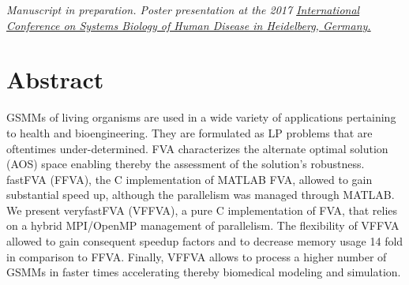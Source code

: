 { \textit{Manuscript in preparation. Poster presentation at the 2017 
\href{https://www.sbhd-conference.org/2017/images/Alphabetical_list_poster_presenters-SBHD_2017.pdf}{International Conference on Systems Biology of Human Disease in Heidelberg, Germany.}
} \par}%
\section*{Abstract}
{  
GSMMs of living organisms are used in a wide variety of applications pertaining to health and bioengineering. They are formulated as LP problems that are oftentimes under-determined. FVA characterizes the alternate optimal solution (AOS) space enabling thereby the assessment of the solution's robustness. fastFVA (FFVA), the C implementation of MATLAB FVA, allowed to gain substantial speed up, although the parallelism was managed through MATLAB. We present veryfastFVA (VFFVA), a pure C implementation of FVA, that relies on a hybrid MPI/OpenMP management of parallelism. The flexibility of VFFVA allowed to gain consequent speedup factors and to decrease memory usage 14 fold in comparison to FFVA. Finally, VFFVA allows to process a higher number of GSMMs in faster times accelerating thereby biomedical modeling and simulation.
\par}%

\newpage

